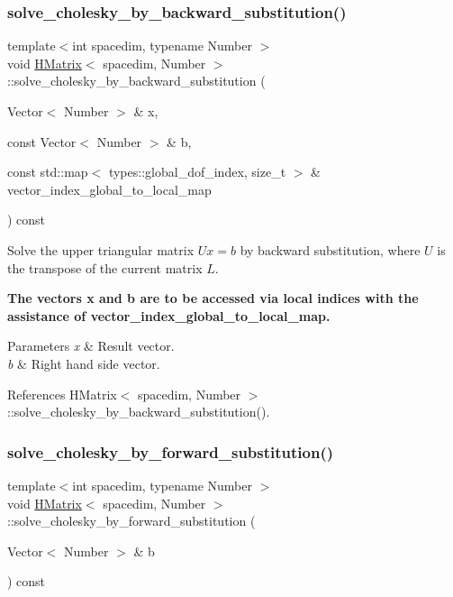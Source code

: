\subsubsection{\texorpdfstring{solve\+\_\+cholesky\+\_\+by\+\_\+backward\+\_\+substitution()}{solve\_cholesky\_by\_backward\_substitution()}\hspace{0.1cm}{\footnotesize\ttfamily [4/4]}}
{\footnotesize\ttfamily template$<$int spacedim, typename Number $>$ \\
void \hyperlink{classHMatrix}{H\+Matrix}$<$ spacedim, Number $>$\+::solve\+\_\+cholesky\+\_\+by\+\_\+backward\+\_\+substitution (\begin{DoxyParamCaption}\item[{Vector$<$ Number $>$ \&}]{x,  }\item[{const Vector$<$ Number $>$ \&}]{b,  }\item[{const std\+::map$<$ types\+::global\+\_\+dof\+\_\+index, size\+\_\+t $>$ \&}]{vector\+\_\+index\+\_\+global\+\_\+to\+\_\+local\+\_\+map }\end{DoxyParamCaption}) const}

Solve the upper triangular matrix $Ux=b$ by backward substitution, where $U$ is the transpose of the current matrix $L$.

{\bfseries The vectors {\ttfamily x} and {\ttfamily b} are to be accessed via local indices with the assistance of {\ttfamily vector\+\_\+index\+\_\+global\+\_\+to\+\_\+local\+\_\+map}.}


\begin{DoxyParams}{Parameters}
{\em x} & Result vector. \\
\hline
{\em b} & Right hand side vector. \\
\hline
\end{DoxyParams}


References H\+Matrix$<$ spacedim, Number $>$\+::solve\+\_\+cholesky\+\_\+by\+\_\+backward\+\_\+substitution().

\mbox{\label{classHMatrix_a09beb710b79d47e34ff3283424cf2a22}} 
\subsubsection{\texorpdfstring{solve\+\_\+cholesky\+\_\+by\+\_\+forward\+\_\+substitution()}{solve\_cholesky\_by\_forward\_substitution()}\hspace{0.1cm}{\footnotesize\ttfamily [1/4]}}
{\footnotesize\ttfamily template$<$int spacedim, typename Number $>$ \\
void \hyperlink{classHMatrix}{H\+Matrix}$<$ spacedim, Number $>$\+::solve\+\_\+cholesky\+\_\+by\+\_\+forward\+\_\+substitution (\begin{DoxyParamCaption}\item[{Vector$<$ Number $>$ \&}]{b }\end{DoxyParamCaption}) const}

